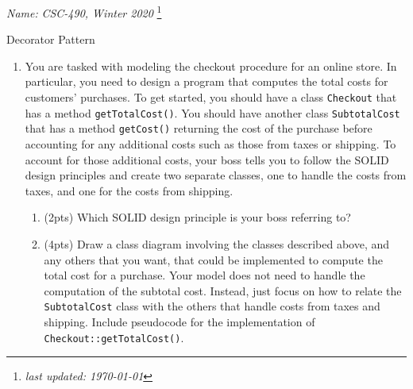 \documentclass[11pt]{article}
\newlength{\up}\setlength{\up}{-\baselineskip}
\newcommand\blfootnote[1]{%
  \begingroup
  \renewcommand\thefootnote{}\footnote{#1}%
  \addtocounter{footnote}{-1}%
  \endgroup
}
\begin{document}
\noindent\emph{Name:}
\hfill
\emph{CSC-490, Winter 2020}
\blfootnote{\emph{last updated: \today}}

\vspace{-0.4in}

\begin{center}
  {\huge Decorator Pattern}
\end{center}

\medskip




\begin{enumerate}

  \item You are tasked with modeling the checkout procedure for an online store. In particular, you need to design a program that computes the total costs for customers' purchases. To get started, you should have a class \texttt{Checkout} that has a method \texttt{getTotalCost()}. You should have another class \texttt{SubtotalCost} that has a method \texttt{getCost()} returning the cost of the purchase before accounting for any additional costs such as those from taxes or shipping. To account for those additional costs, your boss tells you to follow the SOLID design principles and create two separate classes, one to handle the costs from taxes, and one for the costs from shipping. 

  \begin{enumerate}

    \item (2pts) Which SOLID design principle is your boss referring to?
    \vspace{0.2in}

    \item (4pts) Draw a class diagram involving the classes described above, and any others that you want, that could be implemented to compute the total cost for a purchase. Your model does not need to handle the computation of the subtotal cost. Instead, just focus on how to relate the \texttt{SubtotalCost} class with the others that handle costs from taxes and shipping. Include pseudocode for the implementation of \texttt{Checkout::getTotalCost()}.

    \vfill


\end{enumerate}
\end{enumerate}
\end{document}
